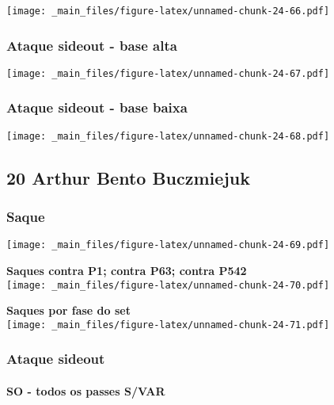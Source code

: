\documentclass[
]{book}
\begin{document}
\texttt{[image: \_main\_files/figure-latex/unnamed-chunk-24-66.pdf]}

\subsubsection*{Ataque sideout - base alta}\label{ataque-sideout---base-alta-3}

\texttt{[image: \_main\_files/figure-latex/unnamed-chunk-24-67.pdf]}

\subsubsection*{Ataque sideout - base baixa}\label{ataque-sideout---base-baixa-3}

\texttt{[image: \_main\_files/figure-latex/unnamed-chunk-24-68.pdf]} \newpage

\subsection{20 Arthur Bento Buczmiejuk}\label{arthur-bento-buczmiejuk}

\subsubsection{Saque}\label{saque-4}

\texttt{[image: \_main\_files/figure-latex/unnamed-chunk-24-69.pdf]}

\textbf{Saques contra P1; contra P63; contra P542}\\
\texttt{[image: \_main\_files/figure-latex/unnamed-chunk-24-70.pdf]}

\textbf{Saques por fase do set}\\
\texttt{[image: \_main\_files/figure-latex/unnamed-chunk-24-71.pdf]} \pagebreak

\subsubsection{Ataque sideout}\label{ataque-sideout-4}

\paragraph*{SO - todos os passes S/VAR}\label{so---todos-os-passes-svar-4}
\end{document}
